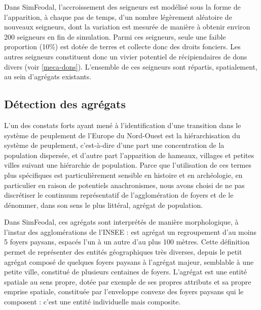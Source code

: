 Dans SimFeodal, l'accroissement des seigneurs est modélisé sous la forme de l'apparition, à chaque pas de temps, d'un nombre légèrement aléatoire de nouveaux seigneurs, dont la variation est mesurée de manière à obtenir environ 200 seigneurs en fin de simulation.
Parmi ces seigneurs, seule une faible proportion (10\%) est dotée de terres et collecte donc des droits fonciers. Les autres seigneurs constituent donc un vivier potentiel de récipiendaires de dons divers (voir \cref{meca-dons}).
L'ensemble de ces seigneurs sont répartis, spatialement, au sein d'agrégats existants.

\subsection{Détection des agrégats \label{meca-agregats}}

L'un des constats forts ayant mené à l'identification d'une \og transition\fg{} \autocite{pumain_convergences_2017, nuninger_cadre_2017} dans le système de peuplement de l'Europe du Nord-Ouest est la hiérarchisation du système de peuplement, c'est-à-dire d'une part une concentration de la population dispersée, et d'autre part l'apparition de hameaux, villages et petites villes suivant une hiérarchie de population.
Parce que l'utilisation de ces termes plus spécifiques est particulièrement sensible en histoire et en archéologie, en particulier en raison de potentiels anachronismes, nous avons choisi de ne pas discrétiser le continuum représentatif de l'agglomération de foyers et de le dénommer, dans son sens le plus littéral, \og agrégat\fg{} de population.

Dans SimFeodal, ces agrégats sont interprétés de manière morphologique, à l'instar des agglomérations de l'INSEE : est agrégat un regroupement d'au moins 5 foyers paysans, espacés l'un à un autre d'au plus 100 mètres.
Cette définition permet de représenter des entités géographiques très diverses, depuis le petit agrégat composé de quelques foyers paysans à l'agrégat majeur, semblable à une petite ville, constitué de plusieurs centaines de foyers.
L'agrégat est une entité spatiale au sens propre, dotée par exemple de ses propres attributs et sa propre emprise spatiale, constituée par l'enveloppe convexe des foyers paysans qui le composent : c'est une entité individuelle mais composite.

